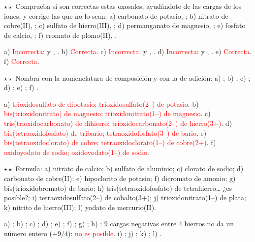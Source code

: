 \begin{exercise}
    \(\star\star\) Comprueba si son correctas estas oxosales, ayudándote de las cargas de los iones, y corrige las que no lo sean:
    a) carbonato de potasio, ; b) nitrato de cobre(II), ; c) sulfato de hierro(III), ; d)
    permanganato de magnesio, ; e) fosfato de calcio, ; f) cromato de plomo(II), .
    \begin{solu}
        a) \textcolor{red}{Incorrecta}:  y , \textcolor{red}{}. b) \textcolor{red}{Correcta}. c)
        \textcolor{red}{Incorrecta}:  y , \textcolor{red}{}. d) \textcolor{red}{Incorrecta}:
         y , \textcolor{red}{}. e) \textcolor{red}{Correcta}. f) \textcolor{red}{Correcta}.
    \end{solu}
\end{exercise}

\begin{exercise}
    \(\star\star\) Nombra con la nomenclatura de composición y con la de adición: a) ; b) ; c)
    ; d) ; e) ; f) .
    \begin{solu}
        a) \textcolor{red}{trioxidosulfato de dipotasio; trioxidosulfato(2\nobreakdash--) de potasio}. b) \textcolor{red}{bis(trioxidonitrato)
        de magnesio; trioxidonitrato(1\nobreakdash--) de magnesio}. c) \textcolor{red}{tris(trioxidocarbonato) de dihierro;
        trioxidocarbonato(2\nobreakdash--) de hierro(3+)}. d) \textcolor{red}{bis(tetraoxidofosfato) de tribario; tetraoxidofosfato(3\nobreakdash--) de
        bario}. e) \textcolor{red}{bis(tetraoxidoclorato) de cobre; tetraoxidoclorato(1\nobreakdash--) de cobre(2+)}. f)
        \textcolor{red}{oxidoyodato de sodio; oxidoyodato(1\nobreakdash--) de sodio}.
    \end{solu}
\end{exercise}

\begin{exercise}
    \(\star\star\) Formula: a) nitrato de calcio; b) sulfato de aluminio; c) clorato de sodio; d) carbonato de cobre(II); e)
    hipoclorito de potasio; f) dicromato de amonio; g) bis(trioxidobromato) de bario; h) tris(tetraoxidofosfato) de
    tetrahierro\dots{} ¿es posible?; i) tetraoxidosulfato(2\nobreakdash--) de cobalto(3+); j) trioxidonitrato(1\nobreakdash--) de plata; k) nitrito de
    hierro(III); l) yodato de mercurio(II).
    \begin{solu}
        a) \textcolor{red}{}; b) \textcolor{red}{}; c) \textcolor{red}{}; d)
        \textcolor{red}{}; e) \textcolor{red}{}; f) \textcolor{red}{}; g)
        \textcolor{red}{}; h) \textcolor{red}{}: 9 cargas negativas entre 4 hierros no da un número
        entero (\(+9/4\)): \textcolor{red}{no es posible}. i) \textcolor{red}{}; j) \textcolor{red}{}; k)
        \textcolor{red}{}; l) \textcolor{red}{}.
    \end{solu}
\end{exercise}

